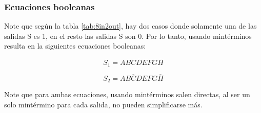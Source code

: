 \documentclass[12pt,a4paper]{article}
\begin{document}
\begin{table}[h!]
\centering
{}
\caption{Tabla de Verdad para decodificador de 8 bits a 2 salidas de 1 bit}
\label{tab:8in2out}
\end{table}

\subsubsection{Ecuaciones booleanas}

Note que según la tabla \ref{tab:8in2out}, hay dos casos donde solamente una de las salidas S es 1, en el resto las salidas S son 0. Por lo tanto, usando mintérminos resulta en la siguientes ecuaciones booleanas: 

\begin{equation}
S_1 = AB\overline{CDE}FG\overline{H}
\end{equation}

\begin{equation}
S_2 = AB\overline{C}DEFG\overline{H}
\end{equation}

Note que para ambas ecuaciones, usando mintérminos salen directas, al ser un solo mintérmino para cada salida, no pueden simplificarse más.
\end{document}
